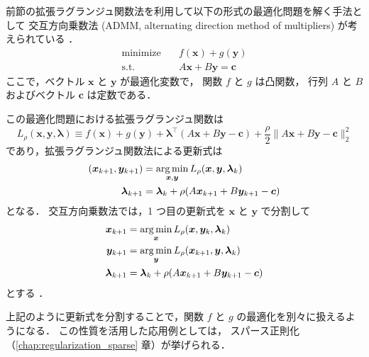 前節の拡張ラグランジュ関数法を利用して以下の形式の最適化問題を解く手法として
交互方向乗数法 (ADMM, alternating direction method of multipliers)
が考えられている \cite{Boyd2010, Hisano2012}．
\begin{equation}
    \begin{aligned}
        \text{minimize} \hspace{1em} & f(\bm{x}) + g(\bm{y})        \\
        \text{s.t.} \hspace{1em}     & A \bm{x} + B \bm{y} = \bm{c}
    \end{aligned}
\end{equation}
ここで，ベクトル $\bm{x}$ と $\bm{y}$ が最適化変数で，
関数 $f$ と $g$ は凸関数，
行列 $A$ と $B$ およびベクトル $\bm{c}$ は定数である．

この最適化問題における拡張ラグランジュ関数は
\begin{equation}
    L_{\rho}(\bm{x}, \bm{y}, \bm{\lambda}) \equiv
    f(\bm{x}) + g(\bm{y}) + \bm{\lambda}^\top (A \bm{x} + B \bm{y} - \bm{c})
    + \frac{\rho}{2} \|A \bm{x} + B \bm{y} - \bm{c}\|_2^2
\end{equation}
であり，拡張ラグランジュ関数法による更新式は
\begin{align}
    (\bm{x}_{k+1}, \bm{y}_{k+1}) & = \operatorname*{arg \thinspace min}_{\bm{x}, \bm{y}} L_{\rho}(\bm{x}, \bm{y}, \bm{\lambda}_{k}) \\
    \bm{\lambda}_{k+1}           & = \bm{\lambda}_k + \rho (A \bm{x}_{k+1} + B \bm{y}_{k+1}- \bm{c})
\end{align}
となる．
交互方向乗数法では，1 つ目の更新式を $\bm{x}$ と $\bm{y}$ で分割して
\begin{align}
    \bm{x}_{k+1}       & = \operatorname*{arg \thinspace min}_{\bm{x}} L_{\rho}(\bm{x}, \bm{y}_{k}, \bm{\lambda}_{k})   \\
    \bm{y}_{k+1}       & = \operatorname*{arg \thinspace min}_{\bm{y}} L_{\rho}(\bm{x}_{k+1}, \bm{y}, \bm{\lambda}_{k}) \\
    \bm{\lambda}_{k+1} & = \bm{\lambda}_k + \rho (A \bm{x}_{k+1} + B \bm{y}_{k+1}- \bm{c})
\end{align}
とする \cite{Boyd2010, Hisano2012}．

上記のように更新式を分割することで，関数 $f$ と $g$ の最適化を別々に扱えるようになる．
この性質を活用した応用例としては，
スパース正則化（\ref{chap:regularization_sparse} 章）が挙げられる．
